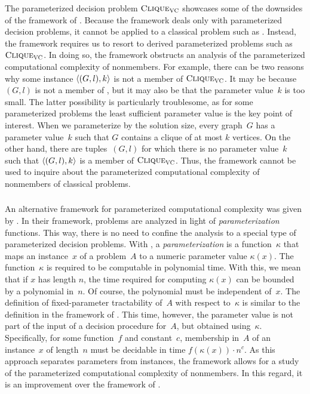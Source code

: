 The parameterized decision problem $\textnormal{\textsc{Clique}}_{\textnormal{\textsc{VC}}}$ showcases some of the downsides of the framework of \citeauthor{downey1999parameterized}.
Because the framework deals only with parameterized decision problems, it cannot be applied to a classical problem such as .
Instead, the framework requires us to resort to derived parameterized problems such as $\textnormal{\textsc{Clique}}_{\textnormal{\textsc{VC}}}$.
In doing so, the framework obstructs an analysis of the parameterized computational complexity of nonmembers.
For example, there can be two reasons why some instance ${\langle (G, l), k\rangle}$ is not a member of $\textnormal{\textsc{Clique}}_{\textnormal{\textsc{VC}}}$.
It may be because $(G, l)$ is not a member of , but it may also be that the parameter value~$k$ is too small.
The latter possibility is particularly troublesome, as for some parameterized problems the least sufficient parameter value is the key point of interest.
When we parameterize  by the solution size, every graph~$G$ has a parameter value~$k$ such that $G$ contains a clique of at most $k$ vertices.
On the other hand, there are tuples~$(G, l)$ for which there is no parameter value~$k$ such that ${\langle (G, l), k\rangle}$ is a member of $\textnormal{\textsc{Clique}}_{\textnormal{\textsc{VC}}}$.
Thus, the \citeauthor{downey1999parameterized} framework cannot be used to inquire about the parameterized computational complexity of nonmembers of classical problems.

\subsubsection{\citeauthor{flum2006parameterized}}
An alternative framework for parameterized computational complexity was given by \textcite{flum2006parameterized}.
In their framework, problems are analyzed in light of \emph{parameterization} functions.
This way, there is no need to confine the analysis to a special type of parameterized decision problems.
With \citeauthor{flum2006parameterized}, a \emph{parameterization} is a function~$\kappa$ that maps an instance~$x$ of a problem~$A$ to a numeric parameter value $\kappa(x)$.
The function~$\kappa$ is required to be computable in polynomial time.
With this, we mean that if $x$ has length $n$, the time required for computing $\kappa(x)$ can be bounded by a polynomial in~$n$.
Of course, the polynomial must be independent of~$x$.
The definition of fixed-parameter tractability of~$A$ with respect to~$\kappa$ is similar to the definition in the framework of \citeauthor{downey1999parameterized}.
This time, however, the parameter value is not part of the input of a decision procedure for~$A$, but obtained using~$\kappa$.
Specifically, for some function~$f$ and constant~$c$, membership in~$A$ of an instance~$x$ of length~$n$ must be decidable in time $f(\kappa(x)) \cdot n^c$.
As this approach separates parameters from instances, the framework allows for a study of the parameterized computational complexity of nonmembers.
In this regard, it is an improvement over the framework of \citeauthor{downey1999parameterized}.

